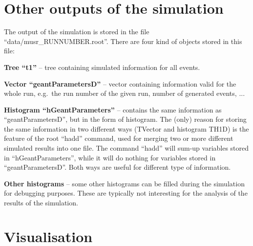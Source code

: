 \documentclass[twoside]{dis04}
\begin{document}
\section{Other outputs of the simulation}
The output of the simulation is stored in the file ``data/musr\_RUNNUMBER.root''.  There are four
kind of objects stored in this file:
%
\begin{description}
\item{\bf Tree ``t1''} -- tree containing simulated information for all events.
\item{\bf Vector ``geantParametersD''} -- vector containing information valid for the whole run,
e.g.\ the run number of the given run, number of generated events, ...
\item{\bf Histogram ``hGeantParameters''} -- contains the same information as ``geantParametersD'',
but in the form of histogram.  The (only) reason for storing the same information in two different ways
(TVector and histogram TH1D) is the feature of the root ``hadd'' command, used for merging two or more different
simulated results into one file.  The command ``hadd'' will sum-up variables stored in ``hGeantParameters'',
while it will do nothing for variables stored in ``geantParametersD''.  
Both ways are useful for different type of information.
\item{\bf Other histograms} -- some other histograms can be filled during the simulation for debugging purposes.
These are typically not interesting for the analysis of the results of the simulation.
\end{description}

\section{Visualisation}
\end{document}
